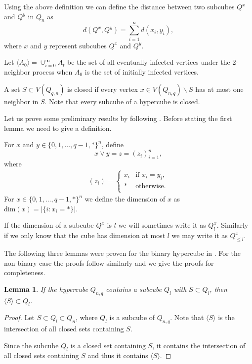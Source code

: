 \documentclass[reqno,11pt]{amsart}
\newtheorem{lemma}[theorem]{Lemma}
\renewcommand{\leq}{\leqslant}
\begin{document}
Using the above definition we can define the distance between two subcubes $Q^x$ and $Q^y$ in $Q_n$ as 
$$d(Q^x,Q^y)=\sum_{i=1}^n d(x_i,y_i),$$
where $x$ and $y$ represent subcubes $Q^x$ and $Q^y$. 

Let $\langle A_0 \rangle= \cup_{i=0}^{\infty} A_t$ be the set of all eventually infected vertices under the 2-neighbor process when $A_0$ is the set of initially infected vertices. 

A set $S \subset V(Q_{q,n})$ is closed if every vertex $x \in V(Q_{n,q}) \backslash S$ has at most one neighbor in $S$. Note that every subcube of a hypercube is closed. 

Let us prove some preliminary results by following \cite{balogh_bollobas_2006}. Before stating the first lemma we need to give a definition.

For $x$ and $y \in \{0,1,\dots,q-1,*\}^n$, define 
$$x \vee y =z =(z_i)_{i=1}^n,$$
where 
\begin{align*}
(z_i)=
\begin{cases}
  x_i& \text{if $x_i =y_i$,} \\
   * & \text{otherwise.}\\
\end{cases}
\end{align*}
For $x \in \{0,1,\dots,q-1,*\}^n$ we define the dimension of $x$ as $\text{dim}(x)=|\{i:x_i=*\}|$.


If the dimension of a subcube $Q^x$ is $l$ we will sometimes write it as $Q_l^x$. Similarly if we only know that the cube has dimension at most $l$ we may write it as $Q_{\leq l}^x$.

The following three lemmas were proven for the binary hypercube in \cite{balogh_bollobas_2006}. For the non-binary case the proofs follow similarly and we give the proofs for completeness.
\begin{lemma} \label{lemma:closed}
    If the hypercube $Q_{n,q}$ contains a subcube $Q_l$ with $S \subset Q_l$, then $\langle S \rangle\subset Q_l$.
\end{lemma}
\begin{proof}
Let $S \subset Q_l \subset Q_n$, where $Q_l$ is a subcube of $Q_{n,q}$. Note that $\langle S \rangle$ is the intersection of all closed sets containing $S$. 

Since the subcube $Q_l$ is a closed set containing $S$, it contains the intersection of all closed sets containing $S$ and thus it contains $\langle S \rangle$. 
\end{proof}
\end{document}
